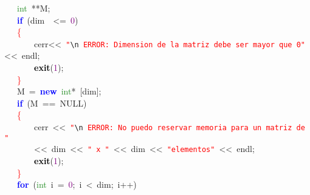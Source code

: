 \mbox{}\ \ \ \ \textcolor{ForestGreen}{int}\ \textcolor{BrickRed}{**}M\textcolor{BrickRed}{;} \\
\mbox{}\ \ \ \ \textbf{\textcolor{Blue}{if}}\ \textcolor{BrickRed}{(}dim\ \ \textcolor{BrickRed}{\textless{}=}\ \textcolor{Purple}{0}\textcolor{BrickRed}{)} \\
\mbox{}\ \ \ \ \textcolor{Red}{\{} \\
\mbox{}\ \ \ \ \ \ \ \ cerr\textcolor{BrickRed}{\textless{}\textless{}}\ \texttt{\textcolor{Red}{"{}}}\texttt{\textcolor{CarnationPink}{\textbackslash{}n}}\texttt{\textcolor{Red}{\ ERROR:\ Dimension\ de\ la\ matriz\ debe\ ser\ mayor\ que\ 0"{}}}\ \textcolor{BrickRed}{\textless{}\textless{}}\ endl\textcolor{BrickRed}{;} \\
\mbox{}\ \ \ \ \ \ \ \ \textbf{\textcolor{Black}{exit}}\textcolor{BrickRed}{(}\textcolor{Purple}{1}\textcolor{BrickRed}{);} \\
\mbox{}\ \ \ \ \textcolor{Red}{\}} \\
\mbox{}\ \ \ \ M\ \textcolor{BrickRed}{=}\ \textbf{\textcolor{Blue}{new}}\ \textcolor{ForestGreen}{int}\textcolor{BrickRed}{*}\ \textcolor{BrickRed}{[}dim\textcolor{BrickRed}{];} \\
\mbox{}\ \ \ \ \textbf{\textcolor{Blue}{if}}\ \textcolor{BrickRed}{(}M\ \textcolor{BrickRed}{==}\ NULL\textcolor{BrickRed}{)} \\
\mbox{}\ \ \ \ \textcolor{Red}{\{} \\
\mbox{}\ \ \ \ \ \ \ \ cerr\ \textcolor{BrickRed}{\textless{}\textless{}}\ \texttt{\textcolor{Red}{"{}}}\texttt{\textcolor{CarnationPink}{\textbackslash{}n}}\texttt{\textcolor{Red}{\ ERROR:\ No\ puedo\ reservar\ memoria\ para\ un\ matriz\ de\ "{}}} \\
\mbox{}\ \ \ \ \ \ \ \ \textcolor{BrickRed}{\textless{}\textless{}}\ dim\ \textcolor{BrickRed}{\textless{}\textless{}}\ \texttt{\textcolor{Red}{"{}\ x\ "{}}}\ \textcolor{BrickRed}{\textless{}\textless{}}\ dim\ \textcolor{BrickRed}{\textless{}\textless{}}\ \texttt{\textcolor{Red}{"{}elementos"{}}}\ \textcolor{BrickRed}{\textless{}\textless{}}\ endl\textcolor{BrickRed}{;} \\
\mbox{}\ \ \ \ \ \ \ \ \textbf{\textcolor{Black}{exit}}\textcolor{BrickRed}{(}\textcolor{Purple}{1}\textcolor{BrickRed}{);} \\
\mbox{}\ \ \ \ \textcolor{Red}{\}} \\
\mbox{}\ \ \ \ \textbf{\textcolor{Blue}{for}}\ \textcolor{BrickRed}{(}\textcolor{ForestGreen}{int}\ i\ \textcolor{BrickRed}{=}\ \textcolor{Purple}{0}\textcolor{BrickRed}{;}\ i\ \textcolor{BrickRed}{\textless{}}\ dim\textcolor{BrickRed}{;}\ i\textcolor{BrickRed}{++)} \\
